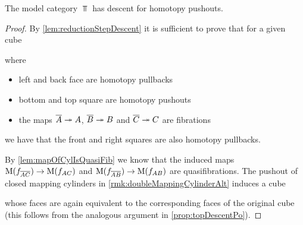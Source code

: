 \begin{prop}\label{lem:topDescentPoAlt}
    The model category $\Top$ has descent for homotopy pushouts. 
    \begin{proof}
        By \cref{lem:reductionStepDescent} it is sufficient to prove that for a given cube
        \begin{center}
        \end{center}
        where 
        \begin{itemize}
            \item left and back face are homotopy pullbacks
            \item bottom and top square are homotopy pushouts
            \item the maps $\overline{A}\xtwoheadrightarrow{} A$, $\overline{B}\xtwoheadrightarrow{} B$ and $\overline{C}\xtwoheadrightarrow{} C$ are fibrations
        \end{itemize}
        we have that the front and right squares are also homotopy pullbacks.

        By \cref{lem:mapOfCylIsQuasiFib} we know that the induced maps $\operatorname{M}(f_{\overline{A}\overline{C}})\to\operatorname{M}(f_{AC})$ and $\operatorname{M}(f_{\overline{A}\overline{B}})\to\operatorname{M}(f_{AB})$ are quasifibrations.
        The pushout of closed mapping cylinders in \cref{rmk:doubleMappingCylinderAlt} induces a cube
        \begin{center}
        \end{center}
        whose faces are again equivalent to the corresponding faces of the original cube (this follows from the analogous argument in \cref{prop:topDescentPo}).
        

\end{proof}
\end{prop}
